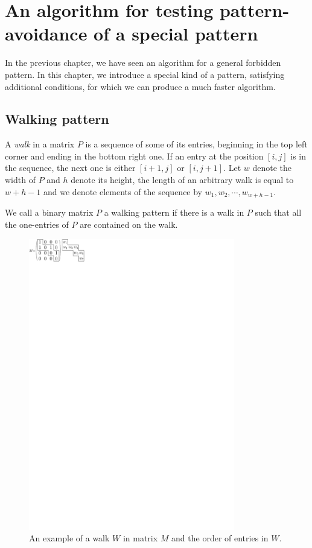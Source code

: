 \chapter{An algorithm for testing pattern-avoidance of a special pattern}
\label{chap:walking}
In the previous chapter, we have seen an algorithm for a general forbidden pattern. In this chapter, we introduce a special kind of a pattern, satisfying additional conditions, for which we can produce a much faster algorithm.

\section{Walking pattern}
\begin{defn}
A \emph{walk} in a matrix $P$ is a sequence of some of its entries, beginning in the top left corner and ending in the bottom right one. If an entry at the position $[i,j]$ is in the sequence, the next one is either $[i+1,j]$ or $[i,j+1]$. Let $w$ denote the width of $P$ and $h$ denote its height, the length of an arbitrary walk is equal to $w+h-1$ and we denote elements of the sequence by $w_1,w_2,\cdots,w_{w+h-1}$.
\end{defn}
\begin{defn}
We call a binary matrix $P$ a walking pattern if there is a walk in $P$ such that all the one-entries of $P$ are contained on the walk.
\end{defn}
\begin{figure}[h!]
\centering
\includegraphics[width=90mm]{../img/walk.pdf}
\caption{An example of a walk $W$ in matrix $M$ and the order of entries in $W$.}
\label{walk}
\end{figure}

